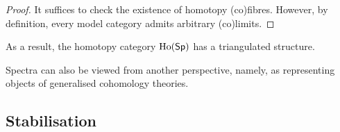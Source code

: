 \begin{proof}
    It suffices to check the existence of homotopy (co)fibres.
    However, by definition, every model category admits arbitrary (co)limits.
\end{proof}

As a result, the homotopy category $\operatorname{Ho}(\mathsf{Sp})$
has a triangulated structure.

Spectra can also be viewed from another perspective,
namely, as representing objects of generalised cohomology theories.

\tbc

\subsection{Stabilisation}

\nyw
